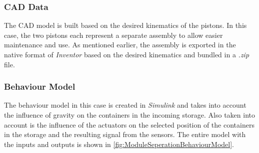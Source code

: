 \subsubsection{CAD Data}
    The CAD model is built based on the desired kinematics of the pistons. In this case, the two pistons each represent a separate assembly to allow easier maintenance and use. As mentioned earlier, the assembly is exported in the native format of \textit{Inventor} based on the desired kinematics and bundled in a \textit{.zip} file. 
    
    
\subsubsection{Behaviour Model}
    The behaviour model in this case is created in \textit{Simulink} and takes into account the influence of gravity on the containers in the incoming storage. Also taken into account is the influence of the actuators on the selected position of the containers in the storage and the resulting signal from the sensors. The entire model with the inputs and outputs is shown in \autoref{fig:ModuleSeperationBehaviourModel}.  \\
    
